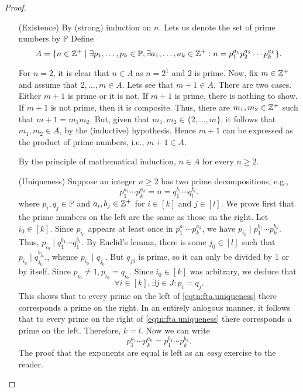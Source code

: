 \documentclass[11pt,a4paper]{article}
\begin{document}
\begin{proof}
\begin{enumerate}[left=2cm]
    \item[(Existence)] By (strong) induction on $n$. Lets us denote the set of prime numbers by \(\mathbb{P}\) Define
\[
A=\{n \in \mathbb{Z}^+ \mid \exists p_1, \ldots, p_k \in \mathbb{P}, \exists a_1, \ldots, a_k \in \mathbb{Z}^+: n=p_1^{a_1} p_2^{a_2} \cdots p_k^{a_k}\} .
\]

For $n=2$, it is clear that $n \in A$ as $n=2^1$ and 2 is prime. Now, fix $m \in \mathbb{Z}^+$ and assume that $2, \ldots, m \in A$. Lets see that $m+1 \in A$. There are two cases. Either $m+1$ is prime or it is not.
If $m+1$ is prime, there is nothing to show.
If $m+1$ is not prime, then it is composite. Thus, there are $m_1, m_2 \in \mathbb{Z}^+$ such that $m+1=m_1 m_2$. But, given that $m_1, m_2 \in\{2, \ldots, m\}$, it follows that $m_1, m_2 \in A$, by the (inductive) hypothesis. Hence $m+1$ can be expressed as the product of prime numbers, i.e., $m+1 \in A$.

By the principle of mathematical induction, $n \in A$ for every $n \geq 2$.

\item[(Uniqueness)] Suppose an integer $n \geq 2$ has two  prime decompositions, e.g.,
\begin{equation}\label{eqtn:fta.uniqueness}
p_1^{a_1} \cdots p_k^{a_k}=n=q_1^{b_1} \cdots q_l^{b_l} .
\end{equation}
where $p_i, q_j \in \mathbb{P}$ and $a_i, b_j \in \mathbb{Z}^+$ for $i \in [k]$ and $j \in [l]$. We prove first that the prime numbers on the left are the same as those on the right.
Let $i_0 \in [k]$. Since $p_{i_0}$ appears at least once in $p_1^{a_1} \cdots p_k^{a_k}$, we have  $p_{i_0} \mid p_1^{b_1} \cdots p_k^{b_k}$.
Thus,
\(
p_{i_0} \mid q_1^{b_1} \cdots q_1^{b_1} .
\)
By Euclid's lemma, 
there is some  $j_0 \in [l]$ such that  $p_{i_0} \mid q_{j_0}^{b_{j_0}}$., whence  $p_{i_0} \mid q_{j_0}$. But $q_{j 0}$ is prime, so it can only be divided by 1 or by itself. Since $p_{i_0} \neq 1, p_{i_0}=q_{i_0}$.
Since $i_0 \in [k]$ was arbitrary, we deduce that
\[
\forall i \in [k], \exists j \in J: p_i=q_j.
\]
This shows that to every prime on the left of \eqref{eqtn:fta.uniqueness} there corresponds a prime on the right.
In an entirely anlogous manner, it follows that to every prime on the right of \eqref{eqtn:fta.uniqueness} there corresponds a prime on the left.
Therefore, \(k=l\).
Now we can write 
\[
p_1^{a_1} \cdots p_k^{a_k}=p_1^{b_1} \cdots p_k^{b_k} .
\]
The proof that the  exponents are equal is left as an \textit{easy} exercise to the reader.


\end{enumerate}
\end{proof}
\end{document}
